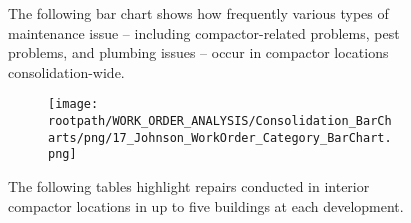\begin{figure}[h]
                                \sf
                                The following bar chart shows how frequently various types of maintenance issue -- including compactor-related problems, pest problems, and plumbing issues -- occur in compactor locations consolidation-wide.
                                \raggedright
                                \begin{subfigure}{\textwidth}
                                \texttt{[image: \\rootpath/WORK\_ORDER\_ANALYSIS/Consolidation\_BarCharts/png/17\_Johnson\_WorkOrder\_Category\_BarChart.png]}
                                \end{subfigure}
                                \end{figure}
\begin{figure}[h]
                                \raggedright
                                \sf
                                The following tables highlight repairs conducted in interior compactor locations in up to five buildings at each development.\\
                                
\end{figure}
